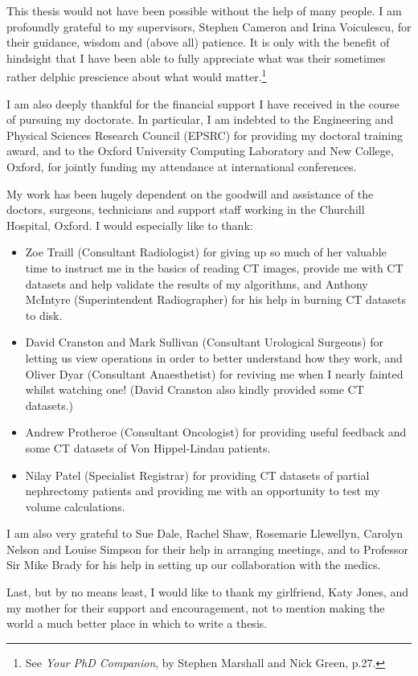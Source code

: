 \begin{acknowledgements}
This thesis would not have been possible without the help of many people. I am profoundly grateful to my supervisors, Stephen Cameron and Irina Voiculescu, for their guidance, wisdom and (above all) patience. It is only with the benefit of hindsight that I have been able to fully appreciate what was their sometimes rather delphic prescience about what would matter.\footnote{See \emph{Your PhD Companion}, by Stephen Marshall and Nick Green, p.27.}

I am also deeply thankful for the financial support I have received in the course of pursuing my doctorate. In particular, I am indebted to the Engineering and Physical Sciences Research Council (EPSRC) for providing my doctoral training award, and to the Oxford University Computing Laboratory and New College, Oxford, for jointly funding my attendance at international conferences.

My work has been hugely dependent on the goodwill and assistance of the doctors, surgeons, technicians and support staff working in the Churchill Hospital, Oxford. I would especially like to thank:
%
\begin{itemize}

\item Zoe Traill (Consultant Radiologist) for giving up so much of her valuable time to instruct me in the basics of reading CT images, provide me with CT datasets and help validate the results of my algorithms, and Anthony McIntyre (Superintendent Radiographer) for his help in burning CT datasets to disk.

\item David Cranston and Mark Sullivan (Consultant Urological Surgeons) for letting us view operations in order to better understand how they work, and Oliver Dyar (Consultant Anaesthetist) for reviving me when I nearly fainted whilst watching one! (David Cranston also kindly provided some CT datasets.)

\item Andrew Protheroe (Consultant Oncologist) for providing useful feedback and some CT datasets of Von Hippel-Lindau patients.

\item Nilay Patel (Specialist Registrar) for providing CT datasets of partial nephrectomy patients and providing me with an opportunity to test my volume calculations.

\end{itemize}
%
I am also very grateful to Sue Dale, Rachel Shaw, Rosemarie Llewellyn, Carolyn Nelson and Louise Simpson for their help in arranging meetings, and to Professor Sir Mike Brady for his help in setting up our collaboration with the medics.

Last, but by no means least, I would like to thank my girlfriend, Katy Jones, and my mother for their support and encouragement, not to mention making the world a much better place in which to write a thesis.

\end{acknowledgements}
